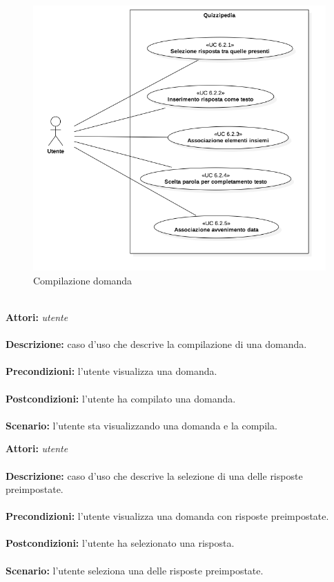 \documentclass[a4paper,11pt]{article}
\begin{document}
\begin{figure}[h!]
\centering
\includegraphics[scale=0.6]{../immagini/UC6_2.png}
\caption{Compilazione domanda}
\end{figure}
\ \\
\textbf{Attori:} \textit{utente}
\\ \\
\textbf{Descrizione:} caso d'uso che descrive la compilazione di una domanda.\\
\\
\textbf{Precondizioni:} l'utente visualizza una domanda.\\
\\
\textbf{Postcondizioni:} l'utente ha compilato una domanda.\\
\\
\textbf{Scenario:} l’utente sta visualizzando una domanda e la compila.\\



\textbf{Attori:} \textit{utente}
\\ \\
\textbf{Descrizione:} caso d'uso che descrive la selezione di una delle risposte preimpostate.\\
\\
\textbf{Precondizioni:} l'utente visualizza una domanda con risposte preimpostate.\\
\\
\textbf{Postcondizioni:} l'utente ha selezionato una risposta.\\
\\
\textbf{Scenario:} l’utente seleziona una delle risposte preimpostate.\\
\end{document}
